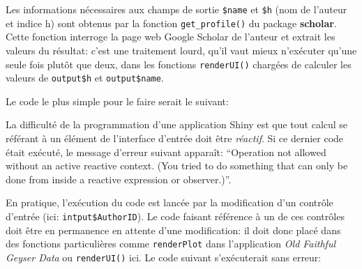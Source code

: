 \documentclass[
  12pt,
  french,
  a4paper,
  extrafontsizes,onecolumn,openright
  ]{memoir}
\newenvironment{Shaded}{\begin{snugshade}}{\end{snugshade}}
\newcommand{\CommentTok}[1]{\textcolor[rgb]{0.56,0.35,0.01}{\textit{#1}}}
\newcommand{\KeywordTok}[1]{\textcolor[rgb]{0.13,0.29,0.53}{\textbf{#1}}}
\newcommand{\NormalTok}[1]{#1}
\newcommand{\OperatorTok}[1]{\textcolor[rgb]{0.81,0.36,0.00}{\textbf{#1}}}
\newcommand{\StringTok}[1]{\textcolor[rgb]{0.31,0.60,0.02}{#1}}
\newlength{\rf}
\begin{document}
\begin{Shaded}
\begin{Highlighting}[]
{\NormalTok{  output}\OperatorTok{$}\NormalTok{network <-}\StringTok{ }\KeywordTok{renderPlot}\NormalTok{(\{}
    \KeywordTok{ggplot}\NormalTok{() }\OperatorTok{+}\StringTok{ }\KeywordTok{geom_blank}\NormalTok{()}
\NormalTok{  \})}
\NormalTok{\}}
\end{Highlighting}
\end{Shaded}

\normalsize

Les informations nécessaires aux champs de sortie \texttt{\$name} et \texttt{\$h} (nom de l'auteur et indice h) sont obtenus par la fonction \texttt{get\_profile()} du package \textbf{scholar}.
Cette fonction interroge la page web Google Scholar de l'auteur et extrait les valeurs du résultat: c'est une traitement lourd, qu'il vaut mieux n'exécuter qu'une seule fois plutôt que deux, dans les fonctions \texttt{renderUI()} chargées de calculer les valeurs de \texttt{output\$h} et \texttt{output\$name}.

Le code le plus simple pour le faire serait le suivant:

\scriptsize

\begin{Shaded}
\end{Shaded}

\normalsize

La difficulté de la programmation d'une application Shiny est que tout calcul se référant à un élément de l'interface d'entrée doit être \emph{réactif}.
Si ce dernier code était exécuté, le message d'erreur suivant apparaît:
\enquote{Operation not allowed without an active reactive context. (You tried to do something that can only be done from inside a reactive expression or observer.)}.

En pratique, l'exécution du code est lancée par la modification d'un contrôle d'entrée (ici: \texttt{intput\$AuthorID}).
Le code faisant référence à un de ces contrôles doit être en permanence en attente d'une modification: il doit donc placé dans des fonctions particulières comme \texttt{renderPlot} dans l'application \emph{Old Faithful Geyser Data} ou \texttt{renderUI()} ici.
Le code suivant s'exécuterait sans erreur:

\scriptsize
\end{document}
